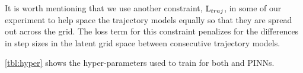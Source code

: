 \documentclass[letterpaper]{article} %
\begin{document}
            It is worth mentioning that we use another constraint, $\text{L}_{traj}$, in some of our experiment to help space the trajectory models equally so that they are spread out across the grid. The loss term for this constraint penalizes for the differences in step sizes in the latent grid space between consecutive trajectory models.
            
            
            





            \cref{tbl:hyper} shows the hyper-parameters used to train \proposedautencoder{} for both \cophy{} and PINNs. %
\end{document}
